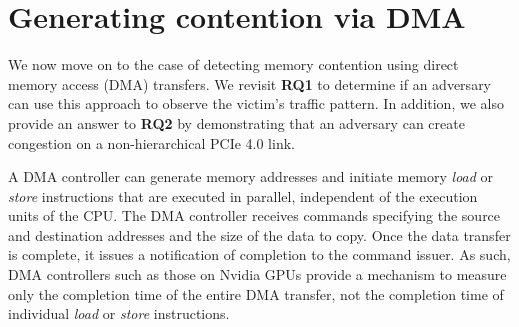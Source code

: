 \section{Generating contention via DMA}
\label{sec:interconnect-sc-dma}

We now move on to the case of detecting memory contention using direct memory access (DMA) transfers.
We revisit \textbf{RQ1} to determine if an adversary can use this approach to observe the victim's traffic pattern. 
In addition, we also provide an answer to \textbf{RQ2} by demonstrating that an adversary can create congestion on a non-hierarchical PCIe 4.0 link.

A DMA controller can generate memory addresses and initiate memory \textit{load} or \textit{store} instructions that are executed in parallel, independent of the execution units of the CPU.
The DMA controller receives commands specifying the source and destination addresses and the size of the data to copy.
Once the data transfer is complete, it issues a notification of completion to the command issuer.
As such, DMA controllers such as those on Nvidia GPUs provide a mechanism to measure only the completion time of the entire DMA transfer, not the completion time of individual \textit{load} or \textit{store} instructions.


